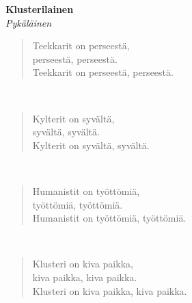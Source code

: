 %
%
\noindent\begin{minipage}{\linewidth}
\vspace{5pt}
\parbox[t]{0.85\linewidth}{\raggedright {\large\bf Klusterilainen}\\[2pt]\small\emph{Pykäläinen}\\[6pt]}
\begin{verse}
	
	Teekkarit on perseestä,\\
	perseestä, perseestä.\\
	Teekkarit on perseestä, perseestä.\\
\end{verse}
\end{minipage}\\[10pt]
\noindent\begin{minipage}{\linewidth}
\begin{verse}
	Kylterit on syvältä,\\
	syvältä, syvältä.\\
	Kylterit on syvältä, syvältä.\\
\end{verse}
\end{minipage}\\[10pt]
\noindent\begin{minipage}{\linewidth}
\begin{verse}
	Humanistit on työttömiä,\\
	työttömiä, työttömiä.\\
	Humanistit on työttömiä, työttömiä.\\
\end{verse}
\end{minipage}\\[10pt]
\noindent\begin{minipage}{\linewidth}
\begin{verse}
	Klusteri on kiva paikka,\\
	kiva paikka, kiva paikka.\\
	Klusteri on kiva paikka, kiva paikka.\\
	
\end{verse}
\end{minipage}\\[10pt]
%
%

